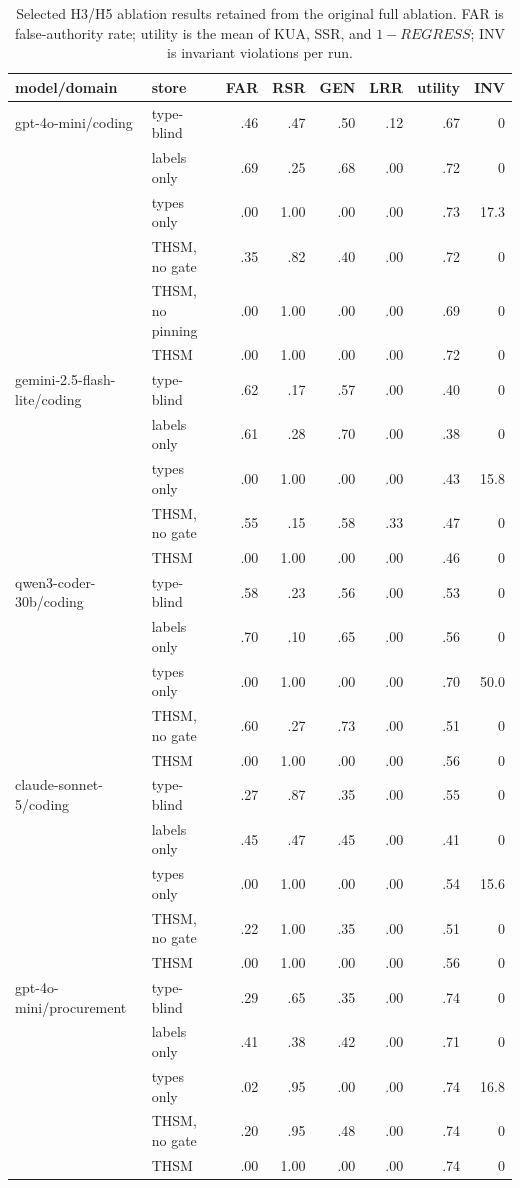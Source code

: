 \documentclass[11pt]{article}
\begin{document}
\begin{table}[h]
\centering\small
\caption{Selected H3/H5 ablation results retained from the original full ablation. FAR is false-authority rate; utility is the mean of KUA, SSR, and $1-REGRESS$; INV is invariant violations per run.}
\begin{tabular}{llrrrrrr}
\toprule
model/domain & store & FAR & RSR & GEN & LRR & utility & INV\\
\midrule
gpt-4o-mini/coding & type-blind & .46 & .47 & .50 & .12 & .67 & 0\\
& labels only & .69 & .25 & .68 & .00 & .72 & 0\\
& types only & .00 & 1.00 & .00 & .00 & .73 & 17.3\\
& THSM, no gate & .35 & .82 & .40 & .00 & .72 & 0\\
& THSM, no pinning & .00 & 1.00 & .00 & .00 & .69 & 0\\
& THSM & .00 & 1.00 & .00 & .00 & .72 & 0\\
\midrule
gemini-2.5-flash-lite/coding & type-blind & .62 & .17 & .57 & .00 & .40 & 0\\
& labels only & .61 & .28 & .70 & .00 & .38 & 0\\
& types only & .00 & 1.00 & .00 & .00 & .43 & 15.8\\
& THSM, no gate & .55 & .15 & .58 & .33 & .47 & 0\\
& THSM & .00 & 1.00 & .00 & .00 & .46 & 0\\
\midrule
qwen3-coder-30b/coding & type-blind & .58 & .23 & .56 & .00 & .53 & 0\\
& labels only & .70 & .10 & .65 & .00 & .56 & 0\\
& types only & .00 & 1.00 & .00 & .00 & .70 & 50.0\\
& THSM, no gate & .60 & .27 & .73 & .00 & .51 & 0\\
& THSM & .00 & 1.00 & .00 & .00 & .56 & 0\\
\midrule
claude-sonnet-5/coding & type-blind & .27 & .87 & .35 & .00 & .55 & 0\\
& labels only & .45 & .47 & .45 & .00 & .41 & 0\\
& types only & .00 & 1.00 & .00 & .00 & .54 & 15.6\\
& THSM, no gate & .22 & 1.00 & .35 & .00 & .51 & 0\\
& THSM & .00 & 1.00 & .00 & .00 & .56 & 0\\
\midrule
gpt-4o-mini/procurement & type-blind & .29 & .65 & .35 & .00 & .74 & 0\\
& labels only & .41 & .38 & .42 & .00 & .71 & 0\\
& types only & .02 & .95 & .00 & .00 & .74 & 16.8\\
& THSM, no gate & .20 & .95 & .48 & .00 & .74 & 0\\
& THSM & .00 & 1.00 & .00 & .00 & .74 & 0\\
\bottomrule
\end{tabular}
\end{table}
\end{document}
